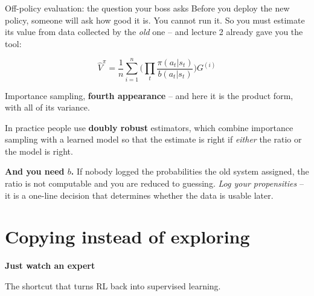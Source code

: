 \documentclass[aspectratio=169]{beamer}
\begin{document}
\begin{frame}{Off-policy evaluation: the question your boss asks}
  \small
  Before you deploy the new policy, someone will ask how good it is. You cannot run it. So you
  must estimate its value from data collected by the \emph{old} one -- and lecture 2 already
  gave you the tool:

  \vskip 4pt
  \begin{center}
  \begin{tcolorbox}[colback=lightbg, colframe=popblue, boxrule=0.7pt, arc=2pt, width=0.74\textwidth]
    \[ \hat{V}^\pi = \frac{1}{n}\sum_{i=1}^{n} \Big(\prod_t \frac{\pi(a_t|s_t)}{b(a_t|s_t)}\Big) G^{(i)} \]
  \end{tcolorbox}
  \end{center}

  \vskip 4pt
  \begin{center}
    \small
    Importance sampling, \textbf{fourth appearance} -- and here it is the product form, with all
    of its variance.
  \end{center}

  \vskip 6pt
  \begin{tcolorbox}[colback=armorange!12, colframe=armorange, boxrule=0.6pt, arc=2pt]
    \small
    In practice people use \textbf{doubly robust} estimators, which combine importance sampling
    with a learned model so that the estimate is right if \emph{either} the ratio or the model
    is right.

    \vskip 4pt
    \textbf{And you need $b$.} If nobody logged the probabilities the old system assigned, the
    ratio is not computable and you are reduced to guessing. \emph{Log your propensities} -- it
    is a one-line decision that determines whether the data is usable later.
  \end{tcolorbox}
\end{frame}

\section{Copying instead of exploring}
\begin{frame}[plain]
  \begin{center}
    \vskip 1.6cm
    {\Huge\bfseries\color{popblue}Just watch an expert}

    \vskip 0.6cm
    {\large The shortcut that turns RL back into supervised learning.}
  \end{center}
\end{frame}
\end{document}
